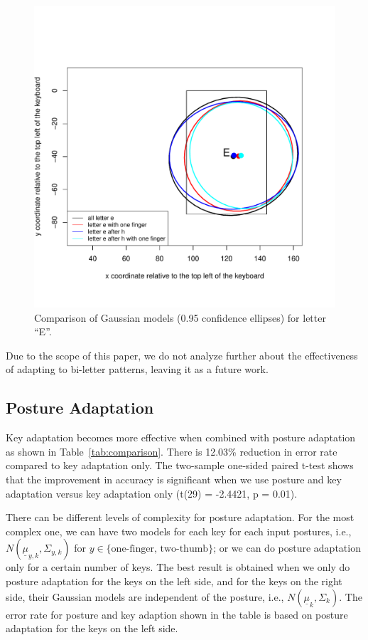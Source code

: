 \documentclass{sigchi}
\begin{document}
\begin{figure}[tb]
  \centering
  \includegraphics[width=0.9\columnwidth]{figures/biletter-he.pdf}
  \caption{Comparison of Gaussian models (0.95 confidence ellipses) for letter
    ``E''.}
  \label{fig:biletter}
\end{figure}

Due to the scope of this paper, we do not analyze further about the
effectiveness of adapting to bi-letter patterns, leaving it as a future
work.

\subsection{Posture Adaptation}
Key adaptation becomes more effective when combined with posture adaptation as
shown in Table~\ref{tab:comparison}. There is 12.03\% reduction in error rate 
compared to key adaptation only. The two-sample one-sided paired t-test shows
that the improvement in accuracy is significant when we use posture and key 
adaptation versus key adaptation only (t(29) = -2.4421, p = 0.01).

There can be different levels of complexity for posture adaptation. For the most complex one, we can have
two models for each key for each input postures, i.e., $N(\underline \mu_{y,k}, \Sigma_{y,k})$ for $y \in
\{\text{one-finger, two-thumb}\}$; or we can do posture adaptation only for a certain
number of keys. The best result is obtained when we only do posture adaptation for the keys on 
the left side, and for the keys on the right side, their Gaussian models are
independent of the posture, i.e., $N(\underline\mu_k, \Sigma_k)$.
The error rate for posture and key adaption shown in the table is based on 
posture adaptation for the keys on the left side. 
\end{document}
